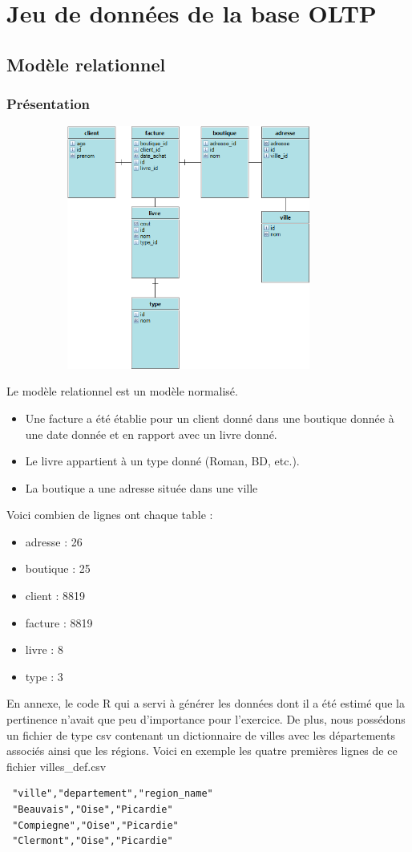 
\chapter{Jeu de données de la base OLTP}
\section{Modèle relationnel}
\subsection{Présentation}

\includegraphics[clip=true, width=120mm, height=80mm]{./images/library.png}

Le modèle relationnel est un modèle normalisé. 
\begin{itemize}
\item Une facture a été établie pour un client donné dans une boutique donnée à une date donnée et en rapport avec un livre donné. 
\item Le livre appartient à un type donné (Roman, BD, etc.). 
\item La boutique a une adresse située dans une ville
\end{itemize}


Voici combien de lignes ont chaque table :
\begin{itemize}
\item adresse : 26
\item boutique : 25
\item client : 8819
\item facture : 8819
\item livre : 8
\item type : 3
\end{itemize}


En annexe, le code R qui a servi à générer les données dont il a été estimé que la pertinence n'avait que peu d'importance pour l'exercice.
De plus, nous possédons un fichier de type csv contenant un dictionnaire de villes avec les départements associés ainsi que les régions.
Voici en exemple les quatre premières lignes de ce fichier villes\_def.csv

\lstset{language=bash}
\lstset{frame=shadowbox}
\begin{lstlisting}
 "ville","departement","region_name"
 "Beauvais","Oise","Picardie"
 "Compiegne","Oise","Picardie"
 "Clermont","Oise","Picardie"
\end{lstlisting}

\clearpage


